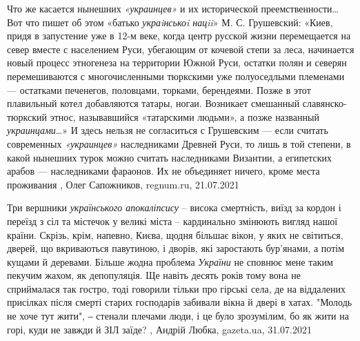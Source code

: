 Что же касается нынешних \emph{«украинцев»} и их исторической преемственности…
Вот что пишет об этом «батько \emph{украiнськоi нацii}» М. С. Грушевский:
«Киев, придя в запустение уже в 12-м веке, когда центр русской жизни
перемещается на север вместе с населением Руси, убегающим от кочевой степи за
леса, начинается новый процесс этногенеза на территории Южной Руси, остатки
полян и северян перемешиваются с многочисленными тюркскими уже полуоседлыми
племенами — остатками печенегов, половцами, торками, берендеями. Позже в этот
плавильный котел добавляются татары, ногаи. Возникает смешанный
славянско-тюркский этнос, называвшийся «татарскими людьми», а позже названный
\emph{украинцами}…» И здесь нельзя не согласиться с Грушевским — если считать
современных \emph{«украинцев»} наследниками Древней Руси, то лишь в той
степени, в какой нынешних турок можно считать наследниками Византии, а
египетских арабов — наследниками фараонов. Их не объединяет ничего, кроме места
проживания
, 
Олег Сапожников, regnum.ru, 21.07.2021

Три вершники \emph{українського апокаліпсису} – висока смертність, виїзд за кордон і
переїзд з сіл та містечок у великі міста – кардинально змінюють вигляд нашої
країни. Скрізь, крім, напевно, Києва, щодня більшає вікон, у яких не світиться,
дверей, що вкриваються павутиною, і дворів, які заростають бур'янами, а потім
кущами й деревами. Більше жодна проблема \emph{України} не сповнює мене таким пекучим
жахом, як депопуляція. Ще навіть десять років тому вона не сприймалася так
гостро, тоді говорили тільки про гірські села, де на віддалених присілках після
смерті старих господарів забивали вікна й двері в хатах. "Молодь не хоче тут
жити", ‒ стенали плечами люди, і це було зрозумілим, бо як жити на горі, куди
не завжди й ЗІЛ заїде?
, 
Андрій Любка, gazeta.ua, 31.07.2021

